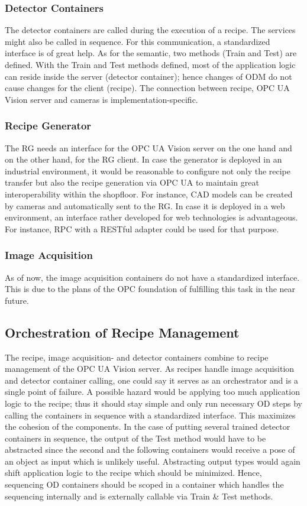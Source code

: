 \subsubsection{Detector Containers}
The detector containers are called during the execution of a recipe. The services might also be called in sequence. For this communication, a standardized interface is of great help. As for the semantic, two methods (Train and Test) are defined. With the Train and Test methods defined, most of the application logic can reside inside the server (detector container); hence changes of ODM do not cause changes for the client (recipe). The connection between recipe, OPC UA Vision server and cameras is implementation-specific.

\subsubsection{Recipe Generator}
The RG needs an interface for the OPC UA Vision server on the one hand and on the other hand, for the RG client. In case the generator is deployed in an industrial environment, it would be reasonable to configure not only the recipe transfer but also the recipe generation via OPC UA to maintain great interoperability within the shopfloor. For instance, CAD models can be created by cameras and automatically sent to the RG. In case it is deployed in a web environment, an interface rather developed for web technologies is advantageous. For instance, RPC with a RESTful adapter could be used for that purpose.

\subsubsection{Image Acquisition}
As of now, the image acquisition containers do not have a standardized interface. This is due to the plans of the OPC foundation of fulfilling this task in the near future.

\subsection{Orchestration of Recipe Management}
The recipe, image acquisition- and  detector containers combine to recipe management of the OPC UA Vision server. As recipes handle image acquisition and detector container calling, one could say it serves as an orchestrator and is a single point of failure. A possible hazard would be applying too much application logic to the recipe; thus it should stay simple and only run necessary OD steps by calling the containers in sequence with a standardized interface. This maximizes the cohesion of the components. In the case of putting several trained detector containers in sequence, the output of the Test method would have to be abstracted since the second and the following containers would receive a pose of an object as input which is unlikely useful. Abstracting output types would again shift application logic to the recipe which should be minimized. Hence, sequencing OD containers should be scoped in a container which handles the sequencing internally and is externally callable via Train \& Test methods.